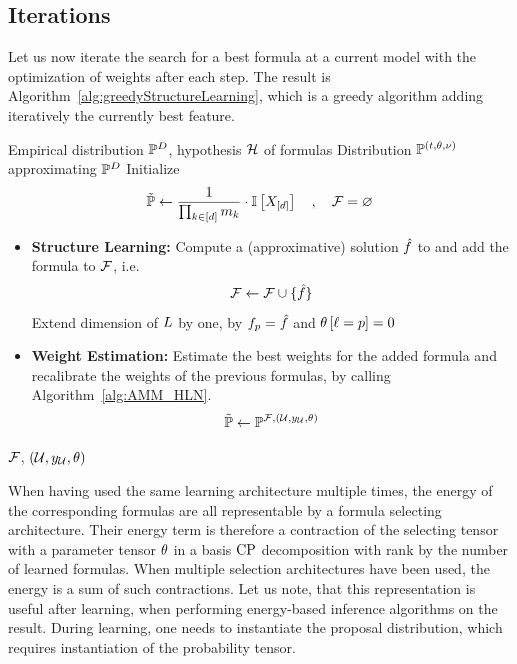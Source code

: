 \subsection{Iterations}

Let us now iterate the search for a best formula at a current model with the optimization of weights after each step.
The result is Algorithm~\ref{alg:greedyStructureLearning}, which is a greedy algorithm adding iteratively the currently best feature.

\begin{algorithm}[hbt!]
    \caption{Greedy Structure Learning}\label{alg:greedyStructureLearning}
    \begin{algorithmic}
        \Require Empirical distribution $\mathbb{P}^{D}$, hypothesis $\mathcal{H}$ of formulas
        \Ensure Distribution $\mathbb{P}^{(t,\theta,\nu)}$ approximating $\mathbb{P}^{D}$
        \iosepline
        \State Initialize
        \[ \tilde{\mathbb{P}} \leftarrow \frac{1}{\prod_{k\in[d]}m_{k}} \cdot \mathbb{I}\left[X_{[d]}\right] \quad, \quad \mathcal{F} = \varnothing \]
            \State
            \begin{itemize}
                \item \textbf{Structure Learning:} Compute a (approximative) solution $\hat{f}$ to  and add the formula to $\mathcal{F}$, i.e.
                \[ \mathcal{F} \leftarrow \mathcal{F} \cup\{\hat{f}\} \]
                Extend dimension of $L$ by one, by $f_{p}=\hat{f}$ and $\theta\left[\ell=p\right]=0$
                \item \textbf{Weight Estimation:} Estimate the best weights for the added formula and recalibrate the weights of the previous formulas, by calling Algorithm~\ref{alg:AMM_HLN}.
                \[ \tilde{\mathbb{P}} \leftarrow \mathbb{P}^{\mathcal{F},(\mathcal{U},y_{\mathcal{U}},\theta)} \]
            \end{itemize}
        \EndWhile
        \State \Return $\mathcal{F}$, $(\mathcal{U},y_{\mathcal{U}},\theta)$ %
    \end{algorithmic}
\end{algorithm}


When having used the same learning architecture multiple times, the energy of the corresponding formulas are all representable by a formula selecting architecture.
Their energy term is therefore a contraction of the selecting tensor with a parameter tensor $\theta$ in a basis $\mathrm{CP}$ decomposition with rank by the number of learned formulas.
When multiple selection architectures have been used, the energy is a sum of such contractions.
% 
Let us note, that this representation is useful after learning, when performing energy-based inference algorithms on the result.
During learning, one needs to instantiate the proposal distribution, which requires instantiation of the probability tensor.



